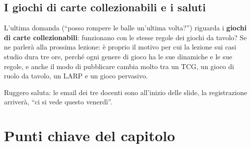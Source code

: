 \subsection{I giochi di carte collezionabili e i saluti}

L'ultima domanda (``posso rompere le balle un'ultima volta?'') riguarda i
\textbf{giochi di carte collezionabili}: funzionano con le stesse regole dei
giochi da tavolo? Se ne parlerà alla prossima lezione: è proprio il motivo per
cui la lezione sui casi studio dura tre ore, perché ogni genere di gioco ha le
sue dinamiche e le sue regole, e anche il modo di pubblicare cambia molto tra un
TCG, un gioco di ruolo da tavolo, un LARP e un gioco pervasivo.

Ruggero saluta: le email dei tre docenti sono all'inizio delle slide, la
registrazione arriverà, ``ci si vede questo venerdì''.

\section*{Punti chiave del capitolo}

